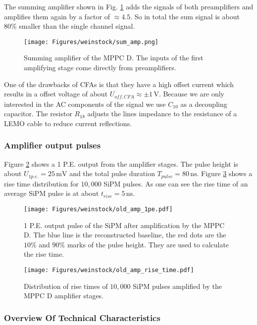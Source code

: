 \documentclass[]{article}
\begin{document}
The summing amplifier shown in Fig. \ref{fig:sum_amp} adds the signals of both preamplifiers and amplifies them again by a factor of $\approx4.5$. So in total the sum signal is about $80\%$ smaller than the single channel signal.

	\begin{figure}[t]
		\centering
			\texttt{[image: Figures/weinstock/sum\_amp.png]}
		\caption{Summing amplifier of the MPPC D. The inputs of the first amplifying stage come directly from preamplifiers.}
		\label{fig:sum_amp}
	\end{figure}	
	
One of the drawbacks of CFAs is that they have a high offset current which results in a offset voltage of about $U_{off,CFA}\approx \pm 1\,\text{V}$. Because we are only interested in the AC components of the signal we use $C_{10}$ as a decoupling capacitor. The resistor $R_{18}$ adjusts the lines impedance to the resistance of a LEMO cable to reduce current reflections.

\subsubsection*{Amplifier output pulses}

Figure \ref{fig:sipm_pulse_old} shows a 1 P.E. output from the amplifier stages. The pulse height is about $U_{1p.e.} = 25\,\text{mV}$ and the total pulse duration $T_{pulse} = 80\,\text{ns}$. Figure \ref{fig:rise_time_old} shows a rise time distribution for $10,000$ SiPM pulses. As one can see the rise time of an average SiPM pulse is at about $t_{rise} = 5\,\text{ns}$.

	\begin{figure}[t]
		\centering
			\texttt{[image: Figures/weinstock/old\_amp\_1pe.pdf]}
		\caption{1 P.E. output pulse of the SiPM after amplification by the MPPC D. The blue line is the reconstructed baseline, the red dots are the $10\%$ and $90 \%$ marks of the pulse height. They are used to calculate the rise time.}
		\label{fig:sipm_pulse_old}
	\end{figure}
	
	\begin{figure}[t]
		\centering
			\texttt{[image: Figures/weinstock/old\_amp\_rise\_time.pdf]}
		\caption{Distribution of rise times of $10,000$ SiPM pulses amplified by the MPPC D amplifier stages.}
		\label{fig:rise_time_old}
	\end{figure}	

\subsubsection{Overview Of Technical Characteristics}
\end{document}
